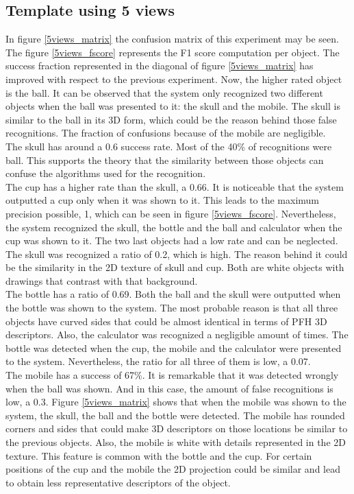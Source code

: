 	\subsection{Template using 5 views}
	In figure \ref{5views_matrix} the confusion matrix of this experiment may be seen.
	The figure \ref{5views_fscore} represents the F1 score computation per object.  
	The success fraction represented in the diagonal of figure \ref{5views_matrix} has improved with respect to the previous experiment. 
	Now, the higher rated object is the ball. 
	It can be observed that the system only recognized two different objects when the ball was presented to it: the skull and the mobile. 
	The skull is similar to the ball in its 3D form, which could be the reason behind those false recognitions. 
	The fraction of confusions because of the mobile are negligible. 
	\\
	The skull has around a 0.6 success rate. 
	Most of the 40\% of recognitions were ball. 
	This supports the theory that the similarity between those objects can confuse the algorithms used for the recognition. 
	\\

	The cup has a higher rate than the skull, a 0.66. 
	It is noticeable that the system outputted a cup only when it was shown to it. 
	This leads to the maximum precision possible, 1, which can be seen in figure \ref{5views_fscore}.
	Nevertheless, the system recognized the skull, the bottle and the ball and calculator when the cup was shown to it. 
	The two last objects had a low rate and can be neglected. 
	The skull was recognized a ratio of 0.2, which is high. 
	The reason behind it could be the similarity in the 2D texture of skull and cup. 
	Both are white objects with drawings that contrast with that background. 
	\\

	The bottle has a ratio of 0.69. 
	Both the ball and the skull were outputted when the bottle was shown to the system. 
	The most probable reason is that all three objects have curved sides that could be almost identical in terms of PFH 3D descriptors. 
	Also, the calculator was recognized a negligible amount of times. 
	The bottle was detected when the cup, the mobile and the calculator were presented to the system. 
	Nevertheless, the ratio for all three of them is low, a 0.07. 
	\\

	The mobile has a success of 67\%. 
	It is remarkable that it was detected wrongly when the ball was shown. 
	And in this case, the amount of false recognitions is low, a 0.3. 
	Figure \ref{5views_matrix} shows that when the mobile was shown to the system, the skull, the ball and the bottle were detected. 
	The mobile has rounded corners and sides that could make 3D descriptors on those locations be similar to the previous objects. 
	Also, the mobile is white with details represented in the 2D texture. 
	This feature is common with the bottle and the cup. 
	For certain positions of the cup and the mobile the 2D projection could be similar and lead to obtain less representative descriptors of the object. 
	\\

